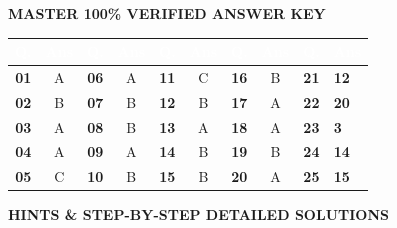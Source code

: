 \documentclass[11pt,a4paper]{article}
\begin{document}
\newpage

\begin{tcolorbox}[sectionbanner]
  {\large \textbf{\textsf{MASTER 100\% VERIFIED ANSWER KEY}}}
\end{tcolorbox}
\vspace{4pt}

\begin{center}
\renewcommand{\arraystretch}{1.25}
\small
\begin{tabularx}{\textwidth}{|>{\centering\arraybackslash}c|>{\centering\arraybackslash}c|>{\centering\arraybackslash}c|>{\centering\arraybackslash}c|>{\centering\arraybackslash}c|>{\centering\arraybackslash}c|>{\centering\arraybackslash}c|>{\centering\arraybackslash}c|>{\centering\arraybackslash}c|>{\centering\arraybackslash}X|}
\hline
\rowcolor{tableDarkHeader}
\textcolor{white}{\textbf{Q.}} & \textcolor{white}{\textbf{Ans}} & \textcolor{white}{\textbf{Q.}} & \textcolor{white}{\textbf{Ans}} & \textcolor{white}{\textbf{Q.}} & \textcolor{white}{\textbf{Ans}} & \textcolor{white}{\textbf{Q.}} & \textcolor{white}{\textbf{Ans}} & \textcolor{white}{\textbf{Q.}} & \textcolor{white}{\textbf{Ans}} \\
\hline
\rowcolor{white}
\textbf{01} & A & \textbf{06} & A & \textbf{11} & C & \textbf{16} & B & \textbf{21} & \textbf{12} \\
\hline
\rowcolor{tableStripe}
\textbf{02} & B & \textbf{07} & B & \textbf{12} & B & \textbf{17} & A & \textbf{22} & \textbf{20} \\
\hline
\rowcolor{white}
\textbf{03} & A & \textbf{08} & B & \textbf{13} & A & \textbf{18} & A & \textbf{23} & \textbf{3} \\
\hline
\rowcolor{tableStripe}
\textbf{04} & A & \textbf{09} & A & \textbf{14} & B & \textbf{19} & B & \textbf{24} & \textbf{14} \\
\hline
\rowcolor{white}
\textbf{05} & C & \textbf{10} & B & \textbf{15} & B & \textbf{20} & A & \textbf{25} & \textbf{15} \\
\hline
\end{tabularx}
\end{center}

\vspace{10pt}

\begin{tcolorbox}[sectionbanner]
  {\large \textbf{\textsf{HINTS \& STEP-BY-STEP DETAILED SOLUTIONS}}}
\end{tcolorbox}
\vspace{6pt}
\end{document}
